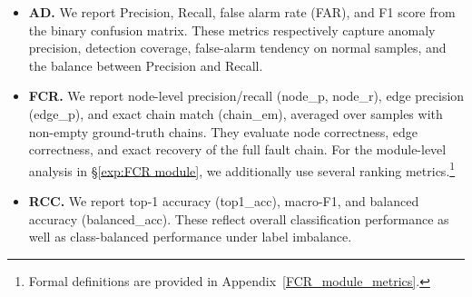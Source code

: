 \documentclass[sigconf,10pt]{acmart} %
\begin{document}
\begin{itemize}[itemsep=0em, topsep=0em, leftmargin=1em]
    \item \textbf{AD.} We report Precision, Recall, false alarm rate (FAR), and F1 score from the binary confusion matrix. These metrics respectively capture anomaly precision, detection coverage, false-alarm tendency on normal samples, and the balance between Precision and Recall.
    \item \textbf{FCR.} We report node-level precision/recall (node\_p, node\_r), edge precision (edge\_p), and exact chain match (chain\_em), averaged over samples with non-empty ground-truth chains. They evaluate node correctness, edge correctness, and exact recovery of the full fault chain. For the module-level analysis in \S\ref{exp:FCR module}, we additionally use several ranking metrics.\footnote{Formal definitions are provided in Appendix~\ref{FCR_module_metrics}.}
    \item \textbf{RCC.} We report top-1 accuracy (top1\_acc), macro-F1, and balanced accuracy (balanced\_acc). These reflect overall classification performance as well as class-balanced performance under label imbalance.
\end{itemize}
\end{document}
